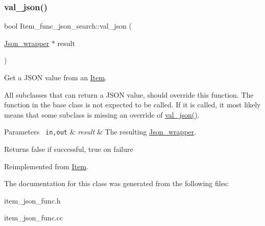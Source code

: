 \mbox{\label{classItem__func__json__search_a69fc8b718e013ca52e964ebafd54de60}} 
\subsubsection{\texorpdfstring{val\+\_\+json()}{val\_json()}}
{\footnotesize\ttfamily bool Item\+\_\+func\+\_\+json\+\_\+search\+::val\+\_\+json (\begin{DoxyParamCaption}\item[{\mbox{\hyperlink{classJson__wrapper}{Json\+\_\+wrapper}} $\ast$}]{result }\end{DoxyParamCaption})\hspace{0.3cm}{\ttfamily [virtual]}}

Get a J\+S\+ON value from an \mbox{\hyperlink{classItem}{Item}}.

All subclasses that can return a J\+S\+ON value, should override this function. The function in the base class is not expected to be called. If it is called, it most likely means that some subclass is missing an override of \mbox{\hyperlink{classItem__func__json__search_a69fc8b718e013ca52e964ebafd54de60}{val\+\_\+json()}}.


\begin{DoxyParams}[1]{Parameters}
\mbox{\texttt{ in,out}}  & {\em result} & The resulting \mbox{\hyperlink{classJson__wrapper}{Json\+\_\+wrapper}}.\\
\hline
\end{DoxyParams}
\begin{DoxyReturn}{Returns}
false if successful, true on failure 
\end{DoxyReturn}


Reimplemented from \mbox{\hyperlink{classItem_a57e763fcde2d0a819d21e31c59611290}{Item}}.



The documentation for this class was generated from the following files\+:\begin{DoxyCompactItemize}
\item 
item\+\_\+json\+\_\+func.\+h\item 
item\+\_\+json\+\_\+func.\+cc\end{DoxyCompactItemize}
